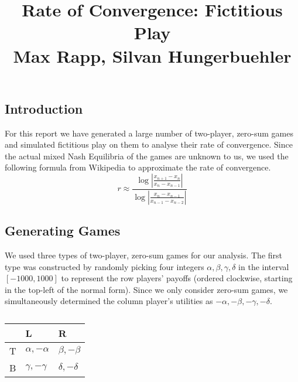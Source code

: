 \documentclass[10pt,a4paper]{article}
\title{%
  Rate of Convergence: Fictitious Play \\
  \large Max Rapp, Silvan Hungerbuehler}
\date{}
\begin{document}
\maketitle

\subsection*{Introduction}
For this report we have generated a large number of two-player, zero-sum games and simulated fictitious play on them to analyse their rate of convergence. Since the actual mixed Nash Equilibria of the games are unknown to us, we used the following formula from Wikipedia to approximate the rate of convergence.
\begin{equation*}
r\approx\frac{\log{|\frac{x_{n+1}-x_{n}}{x_{n}-x_{n-1}}|}}{\log{|\frac{x_{n}-x_{n-1}}{x_{n-1}-x_{n-2}}|}}
\end{equation*}
\subsection*{Generating Games}
We used three types of two-player, zero-sum games for our analysis. The first type was constructed by randomly picking four integers  $\alpha,\beta,\gamma,\delta$ in the interval $[-1000,1000]$ to represent the row players' payoffs (ordered clockwise, starting in the top-left of the normal form). Since we only consider zero-sum games, we simultaneously determined the column player's utilities as $-\alpha,-\beta,-\gamma,-\delta$.
\begin{table}[h]
\centering
\caption{}
\begin{tabular}{|l|l|l|}
\hline
  & L                & R                \\ \hline
T & $\alpha,-\alpha$ & $\beta,-\beta$   \\ \hline
B & $\gamma,-\gamma$ & $\delta,-\delta$ \\ \hline
\end{tabular}
\end{table}
\end{document}
